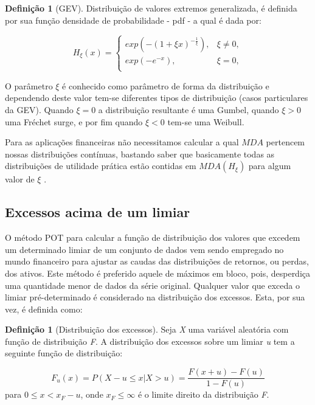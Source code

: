 \documentclass[1p]{elsarticle}
\theoremstyle{definition}
\newtheorem{defi}[teor]{Definição}
\begin{document}
\begin{defi}[GEV] \label{defi:GEV}
	Distribuição de valores extremos generalizada, é definida por sua função densidade de probabilidade - pdf - a qual é dada por:
	
	\begin{equation}
	\label{eq:GEV}
	H_\xi(x) = 
	\begin{cases}
	exp(-(1+\xi x)^{-\frac{1}{\xi}}), & \xi \neq 0,\\
	exp(-e^{-x}), & \xi = 0,\\
	\end{cases}
	\end{equation}
\end{defi}

O parâmetro $\xi$ é conhecido como parâmetro de forma da distribuição e dependendo deste valor tem-se diferentes tipos de distribuição (casos particulares da GEV). Quando $\xi=0$ a distribuição resultante é uma Gumbel, quando  $\xi>0$ uma Fréchet surge, e por fim quando $\xi<0$ tem-se uma Weibull.

Para as aplicações financeiras não necessitamos calcular a qual $MDA$ pertencem nossas distribuições contínuas, bastando saber que basicamente todas as distribuições de utilidade prática estão contidas em $MDA(H_\xi)$ para algum valor de $\xi$ \cite[p. ~139]{McNeil2015}.

\subsection{Excessos acima de um limiar}
\label{sec:excess}

O método POT para calcular a função de distribuição dos valores que excedem um determinado limiar de um conjunto de dados vem sendo empregado no mundo financeiro para ajustar as caudas das distribuições de retornos, ou perdas, dos ativos. Este método é preferido aquele de máximos em bloco, pois, desperdiça uma quantidade menor de dados da série original. Qualquer valor que exceda o limiar pré-determinado é considerado na distribuição dos excessos. Esta, por sua vez, é definida como:

\begin{defi}[Distribuição dos excessos] \label{defi:excess}
	Seja \emph{X} uma variável aleatória com função de distribuição \emph{F}. A distribuição dos excessos sobre um limiar \emph{u} tem a seguinte função de distribuição:
	
	\begin{equation}
	\label{eq:excessdist}
	F_u(x)=P(X-u \leq x | X > u)=\frac{F(x+u)-F(u)}{1-F(u)}
	\end{equation}
	para $0 \leq x < x_F-u$, onde $x_F \leq \infty$ é o limite direito da distribuição \emph{F}.
\end{defi}
\end{document}
